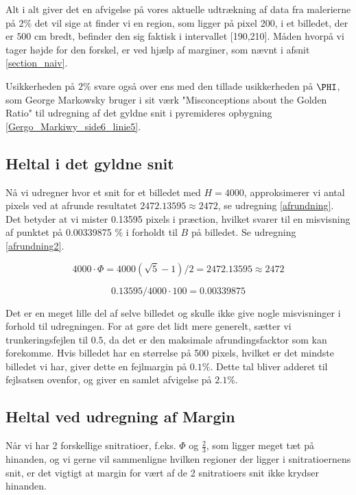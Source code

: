 Alt i alt giver det en afvigelse på vores aktuelle udtrækning af data
fra malerierne på $2\%$ det vil sige at finder vi en region, som ligger
på pixel 200, i et billedet, der er $500$ cm bredt, befinder den sig
faktisk i intervallet [190,210]. Måden hvorpå vi tager højde for den
forskel, er ved hjælp af marginer, som nævnt i afsnit
\ref{section_naiv}. 

Usikkerheden på $2\%$ svare også over ens med den tillade usikkerheden
på $\PHI$, som George Markowsky bruger i sit værk "Misconceptions about
the Golden Ratio" til udregning af det gyldne snit i pyremideres
opbygning \ref{Gergo_Markiwy_side6_linie5}.


\subsection{Heltal i det gyldne snit}
Nå vi udregner hvor et snit for et billedet med $H = 4000$,
approksimerer vi antal pixels ved at afrunde resultatet $2472.13595
\approx 2472$, se udregning \ref{afrundning}. Det betyder at vi mister
0.13595 pixels i præction, hvilket svarer til en misvisning af punktet
på 0.00339875 $\%$ i forholdt til $B$ på billedet. Se udregning
\ref{afrundning2}.

\begin{equation}
	4000 \cdot \varPhi = 4000(\sqrt{5}-1)/2 = 2472.13595 \approx 2472 \label{afrundning}
\end{equation}

\begin{equation}
	0.13595/4000 \cdot 100 = 0.00339875 \label{afrundning2}
\end{equation}

Det er en meget lille del af selve billedet og skulle ikke give nogle
misvisninger i forhold til udregningen. For at gøre det lidt mere
generelt, sætter vi trunkeringsfejlen til $0.5$, da det er den maksimale
afrundingsfacktor som kan forekomme. Hvis billedet har en størrelse på
500 pixels, hvilket er det mindste billedet vi har, giver dette en fejlmargin
på $0.1 \%$. Dette tal bliver adderet til fejlsatsen ovenfor, og giver
en samlet afvigelse på $2.1\%$.



\subsection{Heltal ved udregning af Margin}
Når vi har 2 forskellige snitratioer, f.eks. $\varPhi$ og $\frac{2}{3}$,
som ligger meget tæt på hinanden, og vi gerne vil sammenligne hvilken
regioner der ligger i snitratioernens snit, er det vigtigt at margin for
vært af de 2 snitratioers snit ikke krydser hinanden. 

